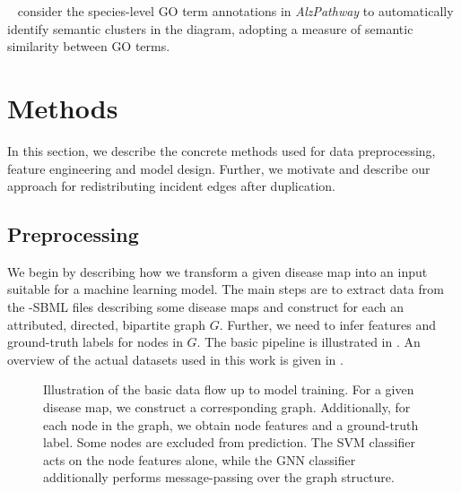 \documentclass[
	fontsize=10pt, %
	twoside=false, %
	secnumdepth=1, %
  toc=indentunnumbered %
]{kaobook}
\begin{document}
\citeauthor{ostaszewski_ClusteringApproachesVisual_2018}~
\cite{ostaszewski_ClusteringApproachesVisual_2018}
consider the
species-level GO term annotations in \textit{AlzPathway} to automatically
identify semantic clusters in the diagram, adopting a measure of semantic
similarity between GO terms.











\chapter{Methods}
\label{sec:methods}

In this section, we describe the concrete methods used for data
preprocessing, feature engineering and model design. Further, we motivate and
describe our approach for redistributing incident edges after duplication.

\section{Preprocessing}
\label{sec:datasets}

We begin by describing how we transform a given disease map into an input
suitable for a machine learning model.
%
The main steps are to extract data from the -SBML files
describing some disease maps and construct for each an attributed, directed,
bipartite graph $G$. Further, we need to infer features and ground-truth labels for nodes in
$G$. The basic pipeline is illustrated in . An overview of
the actual datasets used in this work is given in .


\begin{figure}[h]
  \centering
  \caption{Illustration of the basic data flow up to model training. For a given
    disease map, we construct a corresponding graph. Additionally, for each node
    in the graph, we obtain node features and a ground-truth label. Some nodes are
    excluded from prediction. The SVM classifier acts on the node features alone,
    while the GNN classifier additionally performs message-passing over the graph structure.}
  \label{fig:diag-pipeline}
\end{figure}
\end{document}
